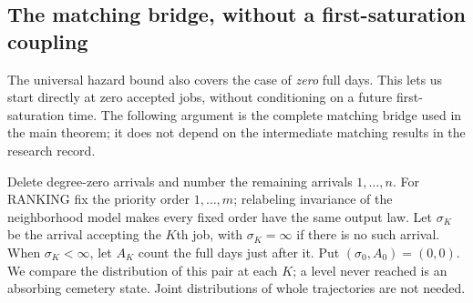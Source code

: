 \documentclass[11pt]{article}
\begin{document}
\subsection{The matching bridge, without a first-saturation coupling}
The universal hazard bound also covers the case of \emph{zero} full
days. This lets us start directly at zero accepted jobs, without
conditioning on a future first-saturation time. The following argument
is the complete matching bridge used in the main theorem; it does not
depend on the intermediate matching results in the research record.

Delete degree-zero arrivals and number the remaining arrivals
$1,\ldots,n$. For RANKING fix the priority order $1,\ldots,m$;
relabeling invariance of the neighborhood model makes every fixed
order have the same output law. Let $\sigma_K$ be the arrival accepting
the $K$th job, with $\sigma_K=\infty$ if there is no such arrival.
When $\sigma_K<\infty$, let $A_K$ count the full days just after it.
Put $(\sigma_0,A_0)=(0,0)$. We compare the distribution of this pair
at each $K$; a level never reached is an absorbing cemetery state.
Joint distributions of whole trajectories are not needed.
\end{document}
